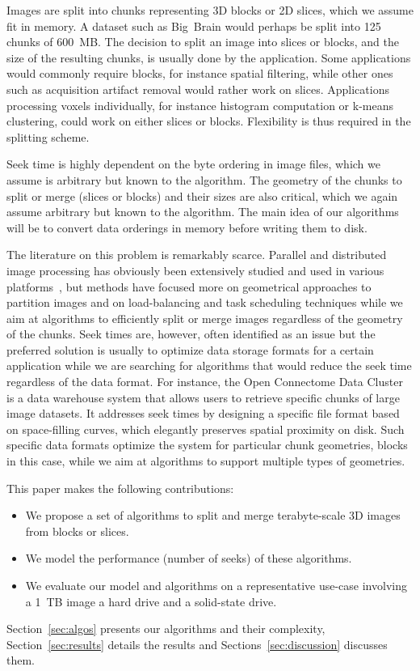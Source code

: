 \documentclass[10pt, conference, compsocconf]{IEEEtran}
\newcommand{\todo}[1]{\marginpar{\parbox{18mm}{\flushleft\tiny\color{red}\textbf{TODO}:
      #1}}}
\begin{document}
Images are split into chunks representing 3D blocks or 2D slices,
which we assume fit in memory. A dataset such as Big~Brain would
perhaps be split into 125 chunks of 600~MB. The decision to split an
image into slices or blocks, and the size of the resulting chunks, is
usually done by the application. Some applications would commonly
require blocks, for instance spatial filtering, while other ones such
as acquisition artifact removal would rather work on
slices. Applications processing voxels individually, for instance
histogram computation or k-means clustering, could work on either
slices or blocks. Flexibility is thus required in the splitting
scheme.

Seek time is highly dependent on the byte ordering in image files,
which we assume is arbitrary but known to the algorithm. The geometry
of the chunks to split or merge (slices or blocks) and their sizes are
also critical, which we again assume arbitrary but known to the
algorithm.  The main idea of our algorithms will be to convert data
orderings in memory before writing them to disk.

The literature on this problem is remarkably scarce. Parallel and
distributed image processing has obviously been extensively studied
and used in various
platforms~\cite{miguet1991elastic,tang2007eman2,yang2008parallel,braunl2013parallel,moise2013terabyte,bajcsy2013terabyte},
but methods have focused more on geometrical approaches to partition
images and on load-balancing and task scheduling techniques while we
aim at algorithms to efficiently split or merge images regardless of
the geometry of the chunks. Seek times are, however, often identified
as an issue but the preferred solution is usually to optimize data
storage formats for a certain application while we are searching for
algorithms that would reduce the seek time regardless of the data
format. For instance, the Open Connectome Data
Cluster~\cite{burns2013open} is a data warehouse system that allows
users to retrieve specific chunks of large image datasets. It
addresses seek times by designing a specific file format based on
space-filling curves, which elegantly preserves spatial proximity on
disk. Such specific data formats optimize the system for particular
chunk geometries, blocks in this case, while we aim at algorithms to
support multiple types of geometries.

This paper makes the following contributions:
\begin{itemize}
  \item We propose a set of algorithms to split and merge
    terabyte-scale 3D images from blocks or slices.
  \item We model the performance (number of seeks) of these algorithms.
  \item We evaluate our model and algorithms on a representative
    use-case involving a 1~TB image a hard drive and a solid-state
    drive.
\end{itemize}
Section~\ref{sec:algos} presents our algorithms and their complexity,
Section~\ref{sec:results} details the results and
Sections~\ref{sec:discussion} discusses them.\todo{Revise when outline is final.}
\end{document}
